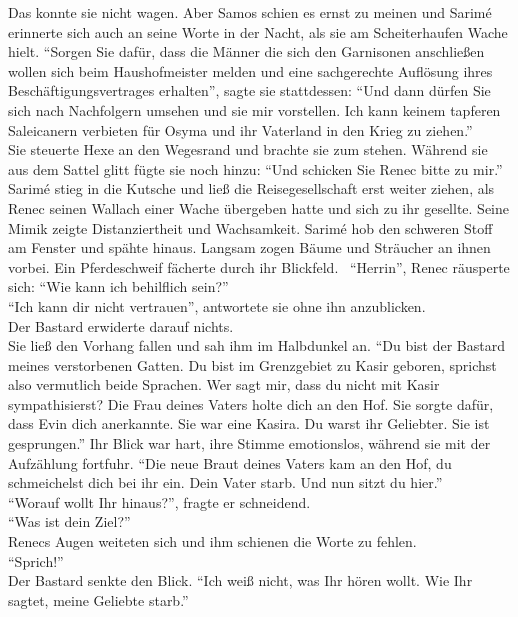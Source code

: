 Das konnte sie nicht wagen. Aber Samos schien es ernst zu meinen und Sarimé erinnerte sich auch an 
seine Worte in der Nacht, als sie am Scheiterhaufen Wache hielt. ``Sorgen Sie dafür, dass die 
Männer die sich den Garnisonen anschließen wollen sich beim Haushofmeister melden und eine 
sachgerechte Auflösung ihres Beschäftigungsvertrages erhalten'', sagte sie stattdessen: ``Und dann 
dürfen Sie sich nach Nachfolgern umsehen und sie mir vorstellen. Ich kann keinem tapferen 
Saleicanern verbieten für Osyma und ihr Vaterland in den Krieg zu ziehen.''\\
Sie steuerte Hexe an den Wegesrand und brachte sie zum stehen. Während sie aus dem Sattel glitt 
fügte sie noch hinzu: ``Und schicken Sie Renec bitte zu mir.''\\
Sarimé stieg in die Kutsche und ließ die Reisegesellschaft erst weiter ziehen, als Renec seinen 
Wallach einer Wache übergeben hatte und sich zu ihr gesellte. Seine Mimik zeigte Distanziertheit 
und Wachsamkeit. Sarimé hob den schweren Stoff am Fenster und spähte hinaus. Langsam zogen Bäume 
und Sträucher an ihnen vorbei. Ein Pferdeschweif fächerte durch ihr Blickfeld. \
``Herrin'', Renec räusperte sich: ``Wie kann ich behilflich sein?''\\
``Ich kann dir nicht vertrauen'', antwortete sie ohne ihn anzublicken.\\
Der Bastard erwiderte darauf nichts.\\
Sie ließ den Vorhang fallen und sah ihm im Halbdunkel an. ``Du bist der Bastard meines verstorbenen 
Gatten. Du bist im Grenzgebiet zu Kasir geboren, sprichst also vermutlich beide Sprachen. Wer sagt 
mir, dass du nicht mit Kasir sympathisierst? Die Frau deines Vaters holte dich an den Hof. Sie 
sorgte dafür, dass Evin dich anerkannte. Sie war eine Kasira. Du warst ihr Geliebter. Sie ist 
gesprungen.'' Ihr Blick war hart, ihre Stimme emotionslos, während sie mit der Aufzählung fortfuhr. 
``Die neue Braut deines Vaters kam an den Hof, du schmeichelst dich bei ihr ein. Dein Vater starb. 
Und nun sitzt du hier.''\\
``Worauf wollt Ihr hinaus?'', fragte er schneidend.\\
``Was ist dein Ziel?''\\
Renecs Augen weiteten sich und ihm schienen die Worte zu fehlen. \\
``Sprich!''\\
Der Bastard senkte den Blick. ``Ich weiß nicht, was Ihr hören wollt. Wie Ihr sagtet, meine Geliebte 
starb.''\\
